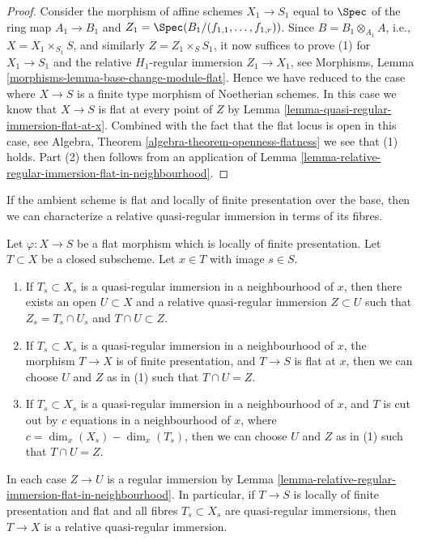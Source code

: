 \begin{proof}
\medskip\noindent
Consider the morphism of affine schemes
$X_1 \to S_1$ equal to $\Spec$ of the
ring map $A_1 \to B_1$ and
$Z_1 = \Spec(B_1/(f_{1, 1}, \ldots, f_{1, r}))$.
Since $B = B_1 \otimes_{A_1} A$, i.e., $X = X_1 \times_{S_1} S$,
and similarly $Z = Z_1 \times_S S_1$,
it now suffices to prove (1) for $X_1 \to S_1$ and the relative
$H_1$-regular immersion $Z_1 \to X_1$, see
Morphisms, Lemma \ref{morphisms-lemma-base-change-module-flat}.
Hence we have reduced to the case where $X \to S$ is a finite type
morphism of Noetherian schemes.
In this case we know that $X \to S$ is flat at every
point of $Z$ by
Lemma \ref{lemma-quasi-regular-immersion-flat-at-x}.
Combined with the fact that the flat locus is open in this case, see
Algebra, Theorem \ref{algebra-theorem-openness-flatness}
we see that (1) holds. Part (2) then follows from an application of
Lemma \ref{lemma-relative-regular-immersion-flat-in-neighbourhood}.
\end{proof}

\noindent
If the ambient scheme is flat and locally of finite presentation over
the base, then we can characterize a relative
quasi-regular immersion in terms of its fibres.

\begin{lemma}
\label{lemma-fibre-quasi-regular}
Let $\varphi : X \to S$ be a flat morphism which is locally of finite
presentation. Let $T \subset X$ be a closed subscheme.
Let $x \in T$ with image $s \in S$.
\begin{enumerate}
\item If $T_s \subset X_s$ is a quasi-regular immersion
in a neighbourhood of $x$, then there exists an open
$U \subset X$ and a relative quasi-regular immersion
$Z \subset U$ such that $Z_s = T_s \cap U_s$ and $T \cap U \subset Z$.
\item If $T_s \subset X_s$ is a quasi-regular immersion
in a neighbourhood of $x$, the morphism $T \to X$ is of finite
presentation, and $T \to S$ is flat at $x$, then we can choose $U$ and
$Z$ as in (1) such that $T \cap U = Z$.
\item If $T_s \subset X_s$ is a quasi-regular immersion in a neighbourhood
of $x$, and $T$ is cut out by $c$ equations in a neighbourhood of $x$,
where $c = \dim_x(X_s) - \dim_x(T_s)$, then we can choose $U$ and $Z$ as in (1)
such that $T \cap U = Z$.
\end{enumerate}
In each case $Z \to U$ is a regular immersion by
Lemma \ref{lemma-relative-regular-immersion-flat-in-neighbourhood}.
In particular, if $T \to S$ is locally of finite presentation and flat and
all fibres $T_s \subset X_s$ are quasi-regular immersions, then
$T \to X$ is a relative quasi-regular immersion.
\end{lemma}

